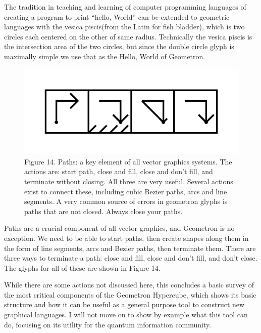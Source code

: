 \documentclass[11pt]{article}
\begin{document}
    The tradition in teaching and learning of computer programming languages of creating a program to print ``hello, World'' can be extended to geometric languages with the vesica piscis(from the Latin for fish bladder), which is two circles each centered on the other of same radius.  Technically the vesica piscis is the intersection area of the two circles, but since the double circle glyph is maximally simple we use that as the Hello, World of Geometron.



\begin{figure}

\includegraphics[width=\linewidth]{figures/figure14_paths.png}

\caption{Figure 14. Paths: a key element of all vector graphics systems.  The actions are: start path, close and fill, close and don't fill, and terminate without closing.  All three are very useful.  Several actions exist to connect these, including cubic Bezier paths, arcs and line segments.  A very common source of errors in geometron glyphs is paths that are not closed.  Always close your paths. }
\end{figure}




    Paths are a crucial component of all vector graphics, and Geometron is no exception.  We need to be able to start paths, then create shapes along them in the form of line segments, arcs and Bezier paths, then terminate them.  There are three ways to terminate a path: close and fill, close and don't fill, and don't close.  The glyphs for all of these are shown in Figure 14.  




    While there are some actions not discussed here, this concludes a basic survey of the most critical components of the Geometron Hypercube, which shows its basic structure and how it can be useful as a general purpose tool to construct new graphical languages.  I will not move on to show by example what this tool can do, focusing on its utility for the quantum information community.
\end{document}
